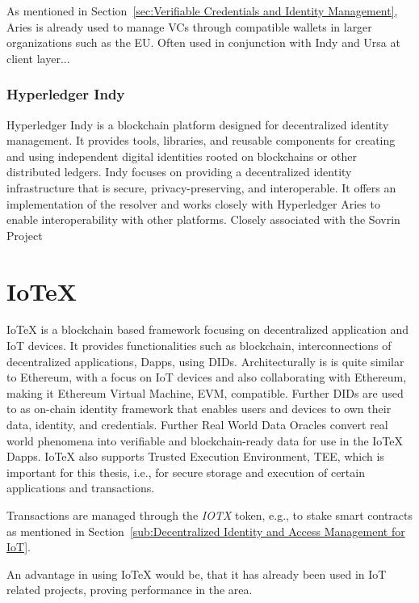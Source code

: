 As mentioned in Section~\ref{sec:Verifiable Credentials and Identity Management}, Aries is already used to manage VCs
through compatible wallets in larger organizations such as the EU. Often used in conjunction with Indy and Ursa at
client layer...

\subsubsection{Hyperledger Indy} %
\label{sec:Hyperledger Indy}
Hyperledger Indy is a blockchain platform designed for decentralized identity management.
It provides tools, libraries, and reusable components for creating and using independent digital identities rooted on blockchains or other distributed ledgers.
Indy focuses on providing a decentralized identity infrastructure that is secure, privacy-preserving, and interoperable.
It offers an implementation of the resolver and works closely with Hyperledger Aries to enable interoperability with other platforms.
Closely associated with the Sovrin Project

\section{IoTeX} %
\label{sec:IoTeX}
IoTeX is a blockchain based framework focusing on decentralized application and IoT devices.
It provides functionalities such as blockchain, interconnections of decentralized applications, Dapps, using DIDs.
Architecturally is is quite similar to Ethereum, with a focus on IoT devices and also collaborating with Ethereum,
making it Ethereum Virtual Machine, EVM, compatible. Further DIDs are used to as on-chain identity framework that
enables users and devices to own their data, identity, and credentials. Further Real World Data Oracles convert real
world phenomena into verifiable and blockchain-ready data for use in the IoTeX Dapps.
IoTeX also supports Trusted Execution Environment, TEE, which is important for this thesis, i.e., for secure storage and
execution of certain applications and transactions.

Transactions are managed through the \textit{IOTX} token, e.g., to stake smart contracts as mentioned in
Section~\ref{sub:Decentralized Identity and Access Management for IoT}.

An advantage in using IoTeX would be, that it has already been used in IoT related projects, proving performance in the
area.

